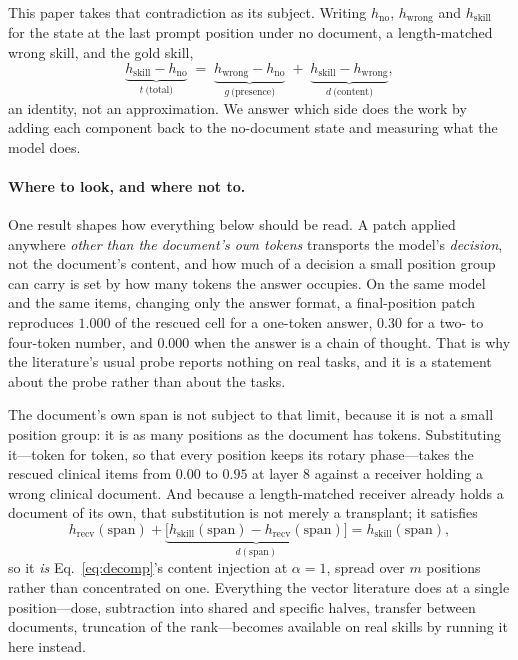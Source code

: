 \documentclass{article}
\newcommand{\dvec}{\ensuremath{d}}
\newcommand{\gvec}{\ensuremath{g}}
\newcommand{\tvec}{\ensuremath{t}}
\begin{document}
This paper takes that contradiction as its subject. Writing $h_{\text{no}}$,
$h_{\text{wrong}}$ and $h_{\text{skill}}$ for the state at the last prompt
position under no document, a length-matched wrong skill, and the gold skill,
\begin{equation}
\underbrace{h_{\text{skill}} - h_{\text{no}}}_{\tvec\ \text{(total)}}
\;=\;
\underbrace{h_{\text{wrong}} - h_{\text{no}}}_{\gvec\ \text{(presence)}}
\;+\;
\underbrace{h_{\text{skill}} - h_{\text{wrong}}}_{\dvec\ \text{(content)}} ,
\end{equation}
an identity, not an approximation. We answer which side does the work by adding
each component back to the no-document state and measuring what the model does.

\paragraph{Where to look, and where not to.} One result shapes how everything
below should be read. A patch applied anywhere \emph{other than the document's
own tokens} transports the model's \emph{decision}, not the document's content,
and how much of a decision a small position group can carry is set by how many
tokens the answer occupies. On the same model and the same items, changing only
the answer format, a final-position patch reproduces $1.000$ of the rescued cell
for a one-token answer, $0.30$ for a two- to four-token number, and $0.000$ when
the answer is a chain of thought. That is why the literature's usual probe
reports nothing on real tasks, and it is a statement about the probe rather than
about the tasks.

The document's own span is not subject to that limit, because it is not a small
position group: it is as many positions as the document has tokens.
Substituting it---token for token, so that every position keeps its rotary
phase---takes the rescued clinical items from $0.00$ to $0.95$ at layer $8$
against a receiver holding a wrong clinical document. And because a
length-matched receiver already holds a document of its own, that substitution
is not merely a transplant; it satisfies
\begin{equation}
h_{\text{recv}}(\text{span}) + \underbrace{\bigl[h_{\text{skill}}(\text{span})
- h_{\text{recv}}(\text{span})\bigr]}_{\dvec(\text{span})}
= h_{\text{skill}}(\text{span}),
\end{equation}
so it \emph{is} Eq.~\ref{eq:decomp}'s content injection at $\alpha = 1$, spread
over $m$ positions rather than concentrated on one. Everything the vector
literature does at a single position---dose, subtraction into shared and
specific halves, transfer between documents, truncation of the rank---becomes
available on real skills by running it here instead.
\end{document}
